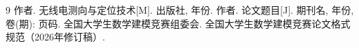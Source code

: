 \begin{thebibliography}{9}
     作者. 无线电测向与定位技术[M]. 出版社, 年份.
     作者. 论文题目[J]. 期刊名, 年份, 卷(期): 页码.
     全国大学生数学建模竞赛组委会. 全国大学生数学建模竞赛论文格式规范（2026年修订稿）.
\end{thebibliography}
